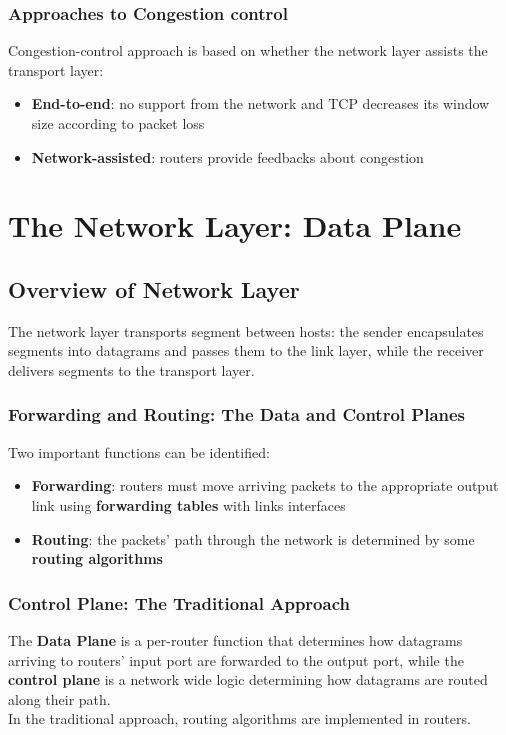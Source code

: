 \documentclass{article}
\begin{document}
\subsubsection{Approaches to Congestion control}
Congestion-control approach is based on whether the network layer assists the transport layer:
\begin{itemize}
    \item \textbf{End-to-end}: no support from the network and TCP decreases its window size according to packet loss
    \item \textbf{Network-assisted}: routers provide feedbacks about congestion
\end{itemize}

\section{The Network Layer: Data Plane}
\subsection{Overview of Network Layer}
The network layer transports segment between hosts: the sender encapsulates segments into datagrams and passes them to the link layer, while the receiver delivers segments to the transport layer.
\subsubsection{Forwarding and Routing: The Data and Control Planes}
Two important functions can be identified:
\begin{itemize}
    \item \textbf{Forwarding}: routers must move arriving packets to the appropriate output link using \textbf{forwarding tables} with links interfaces
    \item \textbf{Routing}: the packets' path through the network is determined by some \textbf{routing algorithms}
\end{itemize}
\subsubsection*{Control Plane: The Traditional Approach}
The \textbf{Data Plane} is a per-router function that determines how datagrams arriving to routers' input port are forwarded to the output port, while the \textbf{control plane} is a network wide logic determining how datagrams are routed along their path. \\ In the traditional approach, routing algorithms are implemented in routers.
\end{document}
